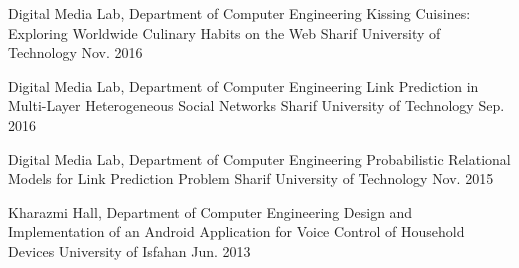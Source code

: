 \begin{cventries}
  \cventryc
    {Digital Media Lab, Department of Computer Engineering}
    {Kissing Cuisines: Exploring Worldwide Culinary Habits on the Web}
    {Sharif University of Technology}
    {Nov. 2016}
    
    
    \cventryc
    {Digital Media Lab, Department of Computer Engineering}
    {Link Prediction in Multi-Layer Heterogeneous Social Networks}
    {Sharif University of Technology}
    {Sep. 2016}
    
    
    \cventryc
    {Digital Media Lab, Department of Computer Engineering}
    {Probabilistic Relational Models for Link Prediction Problem}
    {Sharif University of Technology}
    {Nov. 2015}
    
    
    \cventryc
    {Kharazmi Hall, Department of Computer Engineering}
    {Design and Implementation of an Android Application for Voice Control of Household Devices}
    {University of Isfahan}
    {Jun. 2013}
    
\end{cventries}
